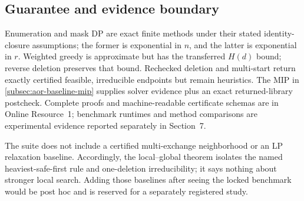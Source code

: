 \subsection{Guarantee and evidence boundary}

Enumeration and mask DP are exact finite methods under their stated
identity-closure assumptions; the former is exponential in \(n\), and the
latter is exponential in \(r\).  Weighted greedy is approximate but has the
transferred \(H(d)\) bound; reverse deletion preserves that bound.  Rechecked
deletion and multi-start return exactly certified feasible, irreducible
endpoints but remain heuristics.  The MIP in
\cref{subsec:aor-baseline-mip} supplies solver evidence plus an exact
returned-library postcheck.  Complete proofs and machine-readable certificate
schemas are in Online Resource~1; benchmark runtimes and method comparisons
are experimental evidence reported separately in Section~7.

The suite does not include a certified multi-exchange neighborhood or an LP
relaxation baseline. Accordingly, the local--global theorem isolates the named
heaviest-safe-first rule and one-deletion irreducibility; it says nothing about
stronger local search. Adding those baselines after seeing the locked benchmark
would be post hoc and is reserved for a separately registered study.
